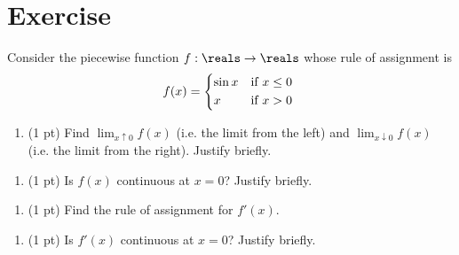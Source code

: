%
%
%
%

\section{Exercise}


Consider the piecewise function $f : \reals \rightarrow \reals$ whose rule of assignment is
\begin{align*}
f(x)
=
\begin{dcases*}
\sin x	&	if $x \leq 0$	\\
x	&	if $x > 0$
\end{dcases*}
\end{align*}

\begin{enumerate}
\item\label{itm : ReQuiz03A a} (1 pt) Find $\displaystyle\lim_{x \uparrow 0} f(x)$ (i.e. the limit from the left) and $\displaystyle\lim_{x \downarrow 0} f(x)$ (i.e. the limit from the right). Justify briefly.
\end{enumerate}

\spaceSolution{1.5in}{}

\begin{enumerate}[resume,label=(\alph*)]
\item\label{itm : ReQuiz03A b} (1 pt) Is $f(x)$ continuous at $x = 0$? Justify briefly.
\end{enumerate}

\spaceSolution{1.5in}{}

\begin{enumerate}[resume,label=(\alph*)]
\item\label{itm : ReQuiz03A c} (1 pt) Find the rule of assignment for $f'(x)$. 
\end{enumerate}

\spaceSolution{1.5in}{}

\begin{enumerate}[resume,label=(\alph*)]
\item\label{itm : ReQuiz03A d} (1 pt) Is $f'(x)$ continuous at $x = 0$? Justify briefly.
\end{enumerate}

\spaceSolution{1.5in}{}